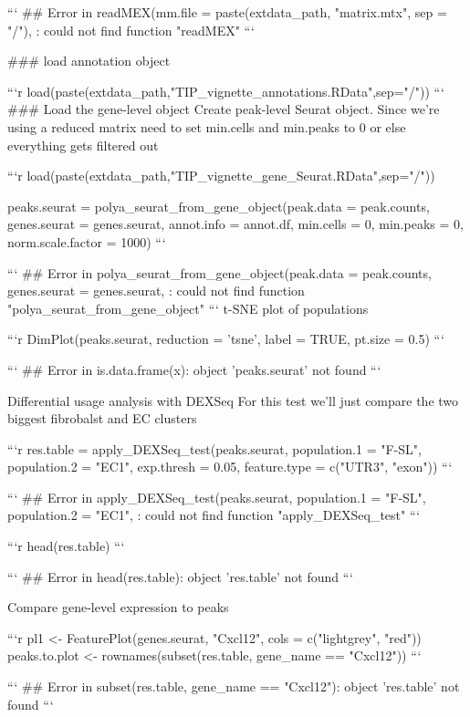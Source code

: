 ```
## Error in readMEX(mm.file = paste(extdata_path, "matrix.mtx", sep = "/"), : could not find function "readMEX"
```

### load annotation object

```r
load(paste(extdata_path,"TIP_vignette_annotations.RData",sep="/"))
```
### Load the gene-level object
Create peak-level Seurat object.
Since we're using a reduced matrix need to set min.cells and min.peaks to 0 or 
else everything gets filtered out


```r
load(paste(extdata_path,"TIP_vignette_gene_Seurat.RData",sep="/"))

peaks.seurat = polya_seurat_from_gene_object(peak.data = peak.counts, 
                                             genes.seurat = genes.seurat, 
                                             annot.info = annot.df, min.cells = 0, min.peaks = 0, 
                                             norm.scale.factor = 1000)
```

```
## Error in polya_seurat_from_gene_object(peak.data = peak.counts, genes.seurat = genes.seurat, : could not find function "polya_seurat_from_gene_object"
```
t-SNE plot of populations

```r
DimPlot(peaks.seurat, reduction = 'tsne', label = TRUE, pt.size = 0.5)
```

```
## Error in is.data.frame(x): object 'peaks.seurat' not found
```

Differential usage analysis with DEXSeq
For this test we'll just compare the two biggest fibrobalst and EC clusters


```r
res.table = apply_DEXSeq_test(peaks.seurat, population.1 = "F-SL", population.2 = "EC1",
                              exp.thresh = 0.05, feature.type = c("UTR3", "exon"))
```

```
## Error in apply_DEXSeq_test(peaks.seurat, population.1 = "F-SL", population.2 = "EC1", : could not find function "apply_DEXSeq_test"
```

```r
head(res.table)
```

```
## Error in head(res.table): object 'res.table' not found
```


Compare gene-level expression to peaks


```r
pl1 <- FeaturePlot(genes.seurat, "Cxcl12", cols = c("lightgrey", "red"))
peaks.to.plot <- rownames(subset(res.table, gene_name == "Cxcl12"))
```

```
## Error in subset(res.table, gene_name == "Cxcl12"): object 'res.table' not found
```

